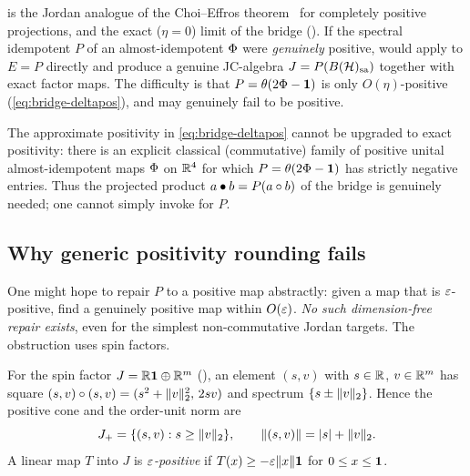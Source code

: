  is the Jordan analogue of the Choi--Effros
theorem~\cite{ChoiEffros1977} for completely positive projections, and the exact
($\eta=0$) limit of the bridge (). If the spectral
idempotent $P$ of an almost-idempotent $\Phi$ were \emph{genuinely} positive,
 would apply to $E=P$ directly and produce a genuine
JC-algebra $J=P(B(\mathcal{H})_{\mathrm{sa}})$ together with exact factor maps. The difficulty is that
$P=\theta(2\Phi-\mathbf{1})$ is only $O(\eta)$-positive
(\eqref{eq:bridge-deltapos}), and may genuinely fail to be positive.

\begin{remark}\label{rem:P-not-positive}
The approximate positivity in \eqref{eq:bridge-deltapos} cannot be upgraded to
exact positivity: there is an explicit classical (commutative) family of
positive unital almost-idempotent maps $\Phi$ on $\mathbb{R}^4$ for which
$P=\theta(2\Phi-\mathbf{1})$ has strictly negative entries. Thus the projected
product $a\bullet b=P(a\circ b)$ of the bridge is genuinely needed; one cannot
simply invoke  for $P$.
\end{remark}

\subsection{Why generic positivity rounding fails}

One might hope to repair $P$ to a positive map abstractly: given a map that is
$\varepsilon$-positive, find a genuinely positive map within $O(\varepsilon)$. \emph{No such
dimension-free repair exists}, even for the simplest non-commutative Jordan
targets. The obstruction uses spin factors.

\begin{definition}\label{def:spin-cone}
For the spin factor $J=\mathbb{R}\mathbf{1}\oplus\mathbb{R}^{m}$ (), an
element $(s,v)$ with $s\in\mathbb{R}$, $v\in\mathbb{R}^{m}$ has square
$(s,v)\circ(s,v)=(s^2+\lVert v \rVert_2^2,\,2sv)$ and spectrum $\{s\pm\lVert v \rVert_2\}$. Hence
the positive cone and the order-unit norm are
\[
  J_+=\{(s,v):s\ge\lVert v \rVert_2\},\qquad
  \lVert (s,v) \rVert=\lvert s\rvert+\lVert v \rVert_2 .
\]
A linear map $T$ into $J$ is \emph{$\varepsilon$-positive} if $T(x)\ge-\varepsilon\lVert x \rVert\mathbf{1}$
for $0\le x\le\mathbf{1}$.
\end{definition}

